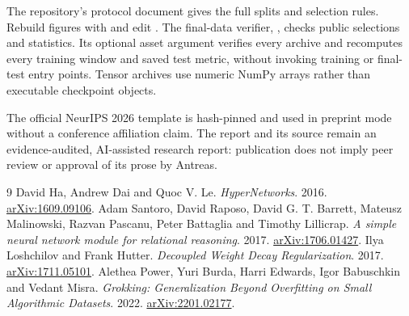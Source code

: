 \documentclass{article}
\begin{document}
The repository's protocol document gives the full splits and selection rules.
Rebuild figures with  and edit
. The final-data verifier,
, checks public selections and statistics.
Its optional asset argument verifies every archive and recomputes every training
window and saved test metric, without invoking training or final-test entry points.
Tensor archives use numeric NumPy arrays rather than executable checkpoint objects.

The official NeurIPS 2026 template is hash-pinned and used in preprint mode without
a conference affiliation claim. The report and its source remain an evidence-audited,
AI-assisted research report: publication does not imply peer review or approval of
its prose by Antreas.

\begin{thebibliography}{9}
\small
{} David Ha, Andrew Dai and Quoc V. Le. \emph{HyperNetworks}. 2016.
\href{https://arxiv.org/abs/1609.09106}{arXiv:1609.09106}.
 Adam Santoro, David Raposo, David G. T. Barrett, Mateusz
Malinowski, Razvan Pascanu, Peter Battaglia and Timothy Lillicrap.
\emph{A simple neural network module for relational reasoning}. 2017.
\href{https://arxiv.org/abs/1706.01427}{arXiv:1706.01427}.
 Ilya Loshchilov and Frank Hutter.
\emph{Decoupled Weight Decay Regularization}. 2017.
\href{https://arxiv.org/abs/1711.05101}{arXiv:1711.05101}.
 Alethea Power, Yuri Burda, Harri Edwards, Igor Babuschkin and
Vedant Misra. \emph{Grokking: Generalization Beyond Overfitting on Small Algorithmic
Datasets}. 2022. \href{https://arxiv.org/abs/2201.02177}{arXiv:2201.02177}.
\end{thebibliography}
\end{document}
